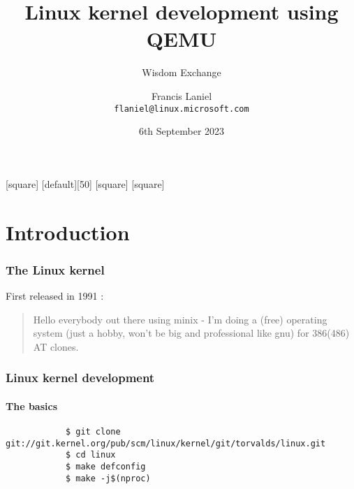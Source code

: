 \documentclass[table, trans, aspectratio = 169]{beamer}
\title[Widsom Exchange]{Linux kernel development using QEMU}
\subtitle{Wisdom Exchange}
\author[Francis Laniel (\texttt{flaniel@linux.microsoft.com})]{Francis Laniel\\\texttt{flaniel@linux.microsoft.com}}
\date{6th September 2023}
\begin{document}
	[square]
	[default][50]
	[square]
	[square]

	\maketitle

	\section{Introduction}
	\begin{frame}
		\frametitle{The Linux kernel}

		First released in 1991 \cite{torvalds_what_nodate}:
		\begin{quote}
			Hello everybody out there using minix -
			I'm doing a (free) operating system (just a hobby, won't be big and professional like gnu) for 386(486) AT clones.
		\end{quote}

	\end{frame}

	\begin{frame}[fragile]
		\frametitle{Linux kernel development}
		\framesubtitle{The basics}

		\begin{verbatim}
			$ git clone git://git.kernel.org/pub/scm/linux/kernel/git/torvalds/linux.git
			$ cd linux
			$ make defconfig
			$ make -j$(nproc)
		\end{verbatim}
	\end{frame}
\end{document}
